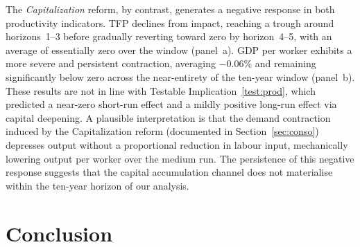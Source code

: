 \documentclass[11pt,english,a4paper, twoside, authoryear]{article}
\begin{document}
The \textit{Capitalization} reform, by contrast, generates a negative response in both productivity indicators. TFP declines from impact, reaching a trough around horizons~1--3 before gradually reverting toward zero by horizon~4--5, with an average of essentially zero over the window (panel~a). GDP per worker exhibits a more severe and persistent contraction, averaging $-$0.06\% and remaining significantly below zero across the near-entirety of the ten-year window (panel~b). These results are not in line with Testable Implication~\ref{test:prod}, which predicted a near-zero short-run effect and a mildly positive long-run effect via capital deepening. A plausible interpretation is that the demand contraction induced by the Capitalization reform (documented in Section~\ref{sec:conso}) depresses output without a proportional reduction in labour input, mechanically lowering output per worker over the medium run. The persistence of this negative response suggests that the capital accumulation channel does not materialise within the ten-year horizon of our analysis.



\FloatBarrier

\section{Conclusion}



%



\clearpage

\setcounter{table}{0}
\renewcommand{\thefigure}{A.\arabic{figure}}
\renewcommand{\thetable}{A.\arabic{table}}



\appendix
\end{document}
